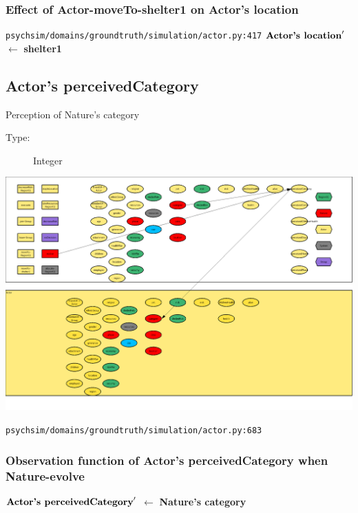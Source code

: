 \documentclass{article}%
\begin{document}
%
\subsubsection{Effect of Actor{-}moveTo{-}shelter1 on Actor's location}%
\label{ssubsec:Effect of Actor{-}moveTo{-}shelter1 on Actor's location}%
\begin{flushleft}%
\verb|psychsim/domains/groundtruth/simulation/actor.py:417|%
\linebreak%
$\mbox{\textbf{Actor's location}} '$%
$\leftarrow$%
\textbf{shelter1}%
\end{flushleft}

%
\subsection{Actor's perceivedCategory}%
\label{subsec:Actor's perceivedCategory}%
Perception of Nature's category%
\begin{description}%
\item[Type:]%
Integer%
\end{description}%
\includegraphics[width=\textwidth]{images/perceivedCategoryOfActor.png}%
\begin{flushleft}%
\verb|psychsim/domains/groundtruth/simulation/actor.py:683|%
\end{flushleft}%
\subsubsection{Observation function of Actor's perceivedCategory when Nature{-}evolve}%
\label{ssubsec:Observation function of Actor's perceivedCategory when Nature{-}evolve}%
\begin{flushleft}%
$\mbox{\textbf{Actor's perceivedCategory}} '$%
$\leftarrow$%
\textbf{Nature's category}%
\end{flushleft}
\end{document}
